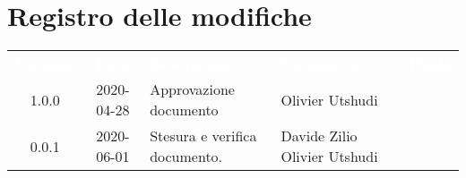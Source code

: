 \section*{Registro delle modifiche}
{
	\centering
	\begin{longtable}{ c c C{4cm}  C{4cm}  C{3cm} }
		\textcolor{white}{\textbf{Versione}} & \textcolor{white}{\textbf{Data}} & \textcolor{white}{\textbf{Descrizione}} & \textcolor{white}{\textbf{Nominativo}} & \textcolor{white}{\textbf{Ruolo}}\\		
		1.0.0 & 2020-04-28 & Approvazione documento & Olivier Utshudi &\RdP{}\\		
		0.0.1 & 2020-06-01 & Stesura e verifica documento. & Davide Zilio \newline Olivier Utshudi &\reda{} \newline \ver{} \\		
		
	\end{longtable}

}